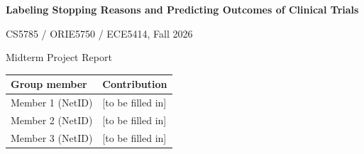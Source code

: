 \begin{titlepage}
\centering
\vspace*{4cm}
{\LARGE\bfseries Labeling Stopping Reasons and Predicting Outcomes of Clinical Trials\par}
\vspace{1.5cm}
{\Large CS5785 / ORIE5750 / ECE5414, Fall 2026\par}
\vspace{0.3cm}
{\large Midterm Project Report\par}
\vspace{2cm}
\begin{tabular}{p{4.5cm}p{9cm}}
\toprule
\textbf{Group member} & \textbf{Contribution} \\
\midrule
Member 1 (NetID) & [to be filled in] \\[0.4em]
Member 2 (NetID) & [to be filled in] \\[0.4em]
Member 3 (NetID) & [to be filled in] \\
\bottomrule
\end{tabular}
\vfill
\end{titlepage}

